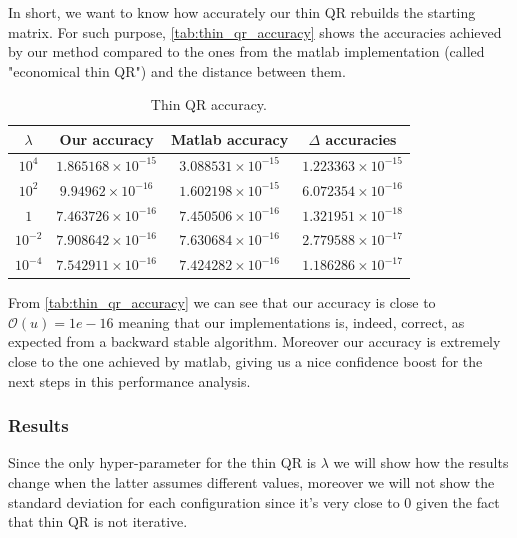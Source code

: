 \noindent In short, we want to know how accurately our thin QR rebuilds the starting matrix. For such purpose, \autoref{tab:thin_qr_accuracy} shows the accuracies achieved by our method compared to the ones from the matlab implementation (called "economical thin QR") and the distance between them.
\begin{table}[H]
\centering
\begin{tabular}{c|c|c|c} \hline \hline
    $\lambda$ & Our accuracy & Matlab accuracy & $\Delta$ accuracies\\
    \hline \hline
    
    \rowcolor{gray!30} $10^4$ & $1.865168 \times 10^{-15}$ & $3.088531 \times 10^{-15}$ & $1.223363 \times 10^{-15}$ \\
    
    $10^2$ & $9.94962 \times 10^{-16}$ & $1.602198 \times 10^{-15}$ & $6.072354 \times 10^{-16}$ \\
    
    \rowcolor{gray!30} $1$ & $7.463726 \times 10^{-16}$ & $7.450506 \times 10^{-16}$ & $1.321951 \times 10^{-18}$ \\
    
    $10^{-2}$ & $7.908642 \times 10^{-16}$ & $7.630684 \times 10^{-16}$ & $2.779588 \times 10^{-17}$ \\
    
    \rowcolor{gray!30} $10^{-4}$ & $7.542911 \times 10^{-16}$ & $7.424282 \times 10^{-16}$ & $1.186286 \times 10^{-17}$ \\
    \hline \hline
\end{tabular}
\caption{Thin QR accuracy.}
\label{tab:thin_qr_accuracy}
\end{table}

\noindent From \autoref{tab:thin_qr_accuracy} we can see that our accuracy is close to $\mathcal{O}(u)=1e-16$ meaning that our implementations is, indeed, correct, as expected from a backward stable algorithm. Moreover our accuracy is extremely close to the one achieved by matlab, giving us a nice confidence boost for the next steps in this performance analysis.

\subsubsection{Results}
Since the only hyper-parameter for the thin QR is $\lambda$ we will show how the results change when the latter assumes different values, moreover we will not show the standard deviation for each configuration since it's very close to $0$ given the fact that thin QR is not iterative.
\vspace{3mm}

